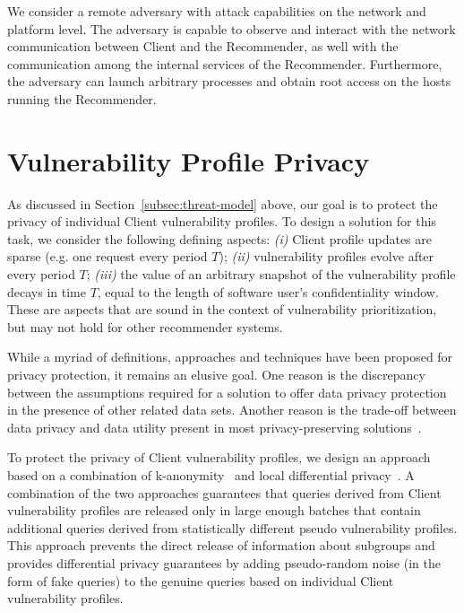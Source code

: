 {We consider a remote adversary with attack capabilities on the network and platform level.
The adversary is capable to observe and interact with the network communication between Client and the Recommender, as well with the communication among the internal services of the Recommender.
Furthermore, the adversary can launch arbitrary processes and obtain root access on the hosts running the Recommender.

\section{Vulnerability Profile Privacy}
\label{sec:solution}

As discussed in Section~\ref{subsec:threat-model} above, our goal is to protect the privacy of individual Client vulnerability profiles.
To design a solution for this task, we consider the following defining aspects: 
\textit{(i)} Client profile updates are sparse (e.g. one request every period $T$); 
\textit{(ii)} vulnerability profiles evolve after every period $T$;
\textit{(iii)} the value of an arbitrary snapshot of the vulnerability profile decays in time $T$, equal to the length of software user's confidentiality window.
These are aspects that are sound in the context of vulnerability prioritization, but may not hold for other recommender systems.

While a myriad of definitions, approaches and techniques have been proposed for privacy protection, it remains an elusive goal.
One reason is the discrepancy between the assumptions required for a solution to offer data privacy protection in the presence of other related data sets.
Another reason is the trade-off between data privacy and data utility present in most privacy-preserving solutions~\cite{dwork:2006, dwork:2014}.

To protect the privacy of Client vulnerability profiles, we design an approach based on a combination of k-anonymity~\cite{samarati:1998, samarati:2001} and local differential privacy~\cite{bassily:2017, tang:2017, zheng:2017}.
A combination of the two approaches guarantees that queries derived from Client vulnerability profiles are released only in large enough batches that contain additional queries derived from statistically different pseudo vulnerability profiles.
This approach prevents the direct release of information about subgroups and provides differential privacy guarantees by adding pseudo-random noise (in the form of fake queries) to the genuine queries based on individual Client vulnerability profiles.

}
